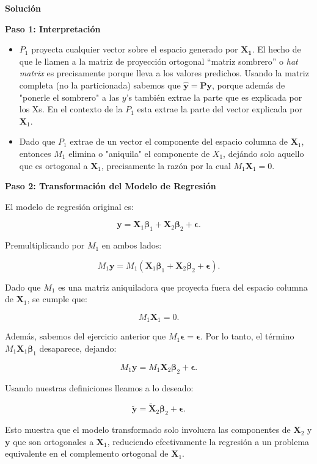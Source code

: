 \documentclass[a4paper, answers, addpoints, 11pt]{exam}
\newenvironment{solucion}{%
  \begin{mdframed}[
    backgroundcolor=blue!5,    %
    linecolor=blue!50,          %
    linewidth=2pt,              %
    leftmargin=10pt,            %
    rightmargin=8pt,           %
    topline=true,              %
    bottomline=true,            %
    roundcorner=10pt,           %
    innerleftmargin=10pt,       %
    innerrightmargin=10pt,      %
    innerbottommargin=10pt,     %
    innertopmargin=10pt         %
  ]%
  \begin{tcolorbox}[colframe=blue!50!black, colback=blue!50, coltitle=white, sharp corners=all, boxrule=1mm, width=\textwidth, halign=left, valign=center, top=0mm, bottom=0mm, left=0mm, right=0mm] \textbf{Solución} \end{tcolorbox} }{\end{mdframed}}
\begin{document}
\begin{enumerate}
\begin{solucion}
\textbf{Paso 1: Interpretación}

\begin{itemize}
    \item $P_1$ proyecta cualquier vector sobre el espacio generado por $\mathbf{X_1}$. El hecho de que le llamen a la matriz de proyección ortogonal ``matriz sombrero''  o \textit{hat matrix} es precisamente porque lleva a los valores predichos. Usando la matriz completa (no la particionada) sabemos que $\hat{\mathbf{y}}=\mathbf{Py}$, porque además de "ponerle el sombrero" a las $y$'s también extrae la parte que es explicada por los Xs. En el contexto de la $P_1$ esta extrae la parte del vector explicada por $\mathbf{X}_1$.
    \item Dado que $P_1$ extrae de un vector el componente del espacio columna de $\mathbf{X}_1$,  entonces $M_1$ elimina o "aniquila" el componente de $X_1$, dejándo solo aquello que es ortogonal a $\mathbf{X}_1$, precisamente la razón por la cual $M_1\mathbf{X}_1=0$. 
\end{itemize}

\textbf{Paso 2: Transformación del Modelo de Regresión}

El modelo de regresión original es:

$$
\mathbf{y} = \mathbf{X}_1 \boldsymbol{\beta}_1 + \mathbf{X}_2 \boldsymbol{\beta}_2 + \boldsymbol{\epsilon}.
$$

Premultiplicando por $M_1$ en ambos lados:

$$
M_1 \mathbf{y} = M_1 (\mathbf{X}_1 \boldsymbol{\beta}_1 + \mathbf{X}_2 \boldsymbol{\beta}_2 + \boldsymbol{\epsilon}).
$$

Dado que $M_1$ es una matriz aniquiladora que proyecta fuera del espacio columna de \( \mathbf{X}_1 \), se cumple que:

\[
M_1 \mathbf{X}_1 = 0.
\]

Además, sabemos del ejercicio anterior que $M_1\boldsymbol{\epsilon}=\boldsymbol{\epsilon}$. Por lo tanto, el término \( M_1 \mathbf{X}_1 \boldsymbol{\beta}_1 \) desaparece, dejando:

\[
M_1 \mathbf{y} = M_1 \mathbf{X}_2 \boldsymbol{\beta}_2 +\boldsymbol{\epsilon}.
\]

Usando nuestras definiciones lleamos a lo deseado:

\[
\tilde{\mathbf{y}} = \tilde{\mathbf{X}}_2 \boldsymbol{\beta}_2 + \boldsymbol{\epsilon}.
\]


Esto muestra que el modelo transformado solo involucra las componentes de \( \mathbf{X}_2 \) y \( \mathbf{y} \) que son ortogonales a \( \mathbf{X}_1 \), reduciendo efectivamente la regresión a un problema equivalente en el complemento ortogonal de \( \mathbf{X}_1 \).



\end{solucion}
\end{enumerate}
\end{document}
